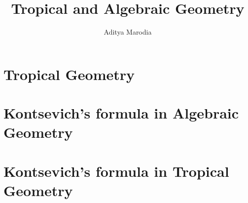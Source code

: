\documentclass[twoside, 12pt]{iiser-thesis}
\title{Tropical and Algebraic Geometry}
\author{Aditya Marodia}
\theoremstyle{definition}
\theoremstyle{plain}
\begin{document}
\thesisfront

\chapter{Tropical Geometry}
\label{chapTrop}


%

\chapter{Kontsevich's formula in Algebraic Geometry}
\label{chap:kontalggeom}


\chapter{Kontsevich's formula in Tropical Geometry}
\label{chap:kottropgeom}




\end{document}

